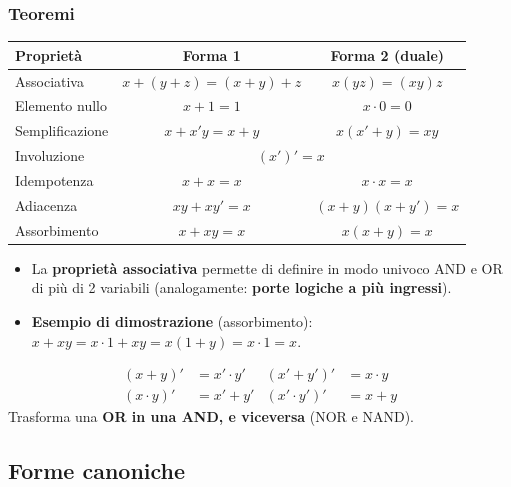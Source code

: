 \documentclass[12pt, a4paper]{article}
\begin{document}
\subsubsection{Teoremi}
\begin{center}
\renewcommand{\arraystretch}{1.35}
\begin{tabular}{|l|c|c|}
\hline
\colorbox{gray!25}{\color{black}\textbf{Proprietà}} & \colorbox{gray!25}{\color{black}\textbf{Forma 1}} & \colorbox{gray!25}{\color{black}\textbf{Forma 2 (duale)}} \\ \hline
Associativa & $x + (y + z) = (x + y) + z$ & $x(yz) = (xy)z$ \\ \hline
Elemento nullo & $x + 1 = 1$ & $x \cdot 0 = 0$ \\ \hline
Semplificazione & $x + x'y = x + y$ & $x(x' + y) = xy$ \\ \hline
Involuzione & \multicolumn{2}{c|}{$(x')' = x$} \\ \hline
Idempotenza & $x + x = x$ & $x \cdot x = x$ \\ \hline
Adiacenza & $xy + xy' = x$ & $(x + y)(x + y') = x$ \\ \hline
Assorbimento & $x + xy = x$ & $x(x + y) = x$ \\ \hline
\end{tabular}
\end{center}

\begin{itemize}
    \item La \textbf{proprietà associativa} permette di definire in modo univoco AND e OR di più di 2 variabili (analogamente: \textbf{porte logiche a più ingressi}).
    \item \textbf{Esempio di dimostrazione} (assorbimento): $x + xy = x \cdot 1 + xy = x(1 + y) = x \cdot 1 = x$.
\end{itemize}

\begin{tcolorbox}[colback=blue!5!white, colframe=blue!60!black, title=\textbf{Legge di De Morgan}]
\begin{align*}
(x + y)' &= x' \cdot y' & (x' + y')' &= x \cdot y \\
(x \cdot y)' &= x' + y' & (x' \cdot y')' &= x + y
\end{align*}
Trasforma una \textbf{OR in una AND, e viceversa} (NOR e NAND).
\end{tcolorbox}

\subsection{Forme canoniche}
\end{document}
